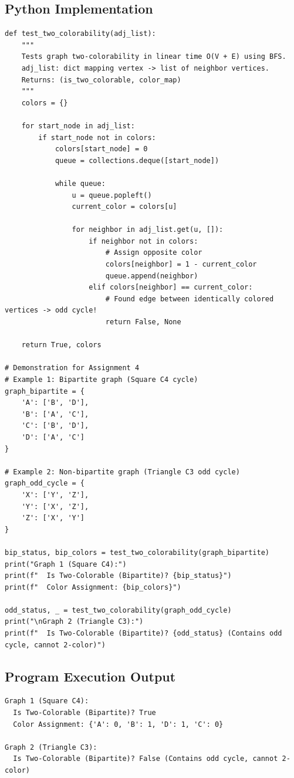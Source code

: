 \documentclass[12pt]{article}
\begin{document}
\subsection*{Python Implementation}
\begin{lstlisting}[style=code]
def test_two_colorability(adj_list):
    """
    Tests graph two-colorability in linear time O(V + E) using BFS.
    adj_list: dict mapping vertex -> list of neighbor vertices.
    Returns: (is_two_colorable, color_map)
    """
    colors = {}

    for start_node in adj_list:
        if start_node not in colors:
            colors[start_node] = 0
            queue = collections.deque([start_node])

            while queue:
                u = queue.popleft()
                current_color = colors[u]

                for neighbor in adj_list.get(u, []):
                    if neighbor not in colors:
                        # Assign opposite color
                        colors[neighbor] = 1 - current_color
                        queue.append(neighbor)
                    elif colors[neighbor] == current_color:
                        # Found edge between identically colored vertices -> odd cycle!
                        return False, None

    return True, colors

# Demonstration for Assignment 4
# Example 1: Bipartite graph (Square C4 cycle)
graph_bipartite = {
    'A': ['B', 'D'],
    'B': ['A', 'C'],
    'C': ['B', 'D'],
    'D': ['A', 'C']
}

# Example 2: Non-bipartite graph (Triangle C3 odd cycle)
graph_odd_cycle = {
    'X': ['Y', 'Z'],
    'Y': ['X', 'Z'],
    'Z': ['X', 'Y']
}

bip_status, bip_colors = test_two_colorability(graph_bipartite)
print("Graph 1 (Square C4):")
print(f"  Is Two-Colorable (Bipartite)? {bip_status}")
print(f"  Color Assignment: {bip_colors}")

odd_status, _ = test_two_colorability(graph_odd_cycle)
print("\nGraph 2 (Triangle C3):")
print(f"  Is Two-Colorable (Bipartite)? {odd_status} (Contains odd cycle, cannot 2-color)")
\end{lstlisting}

\subsection*{Program Execution Output}
\begin{lstlisting}[style=output]
Graph 1 (Square C4):
  Is Two-Colorable (Bipartite)? True
  Color Assignment: {'A': 0, 'B': 1, 'D': 1, 'C': 0}

Graph 2 (Triangle C3):
  Is Two-Colorable (Bipartite)? False (Contains odd cycle, cannot 2-color)
\end{lstlisting}
\end{document}
